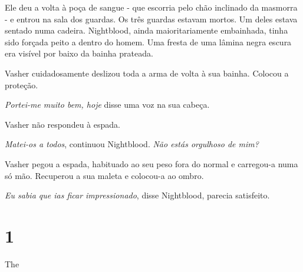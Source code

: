 \documentclass[11pt,a4paper]{book}
\begin{document}
 Ele deu a volta à poça de sangue - que escorria pelo chão inclinado da masmorra -  e entrou na sala dos guardas. Os três guardas estavam mortos. Um deles estava sentado numa cadeira. Nightblood, ainda maioritariamente embainhada, tinha sido forçada peito a dentro do homem. Uma fresta de uma lâmina negra escura era visível por baixo da bainha prateada.
 
 Vasher cuidadosamente deslizou toda a arma de volta à sua bainha. Colocou a proteção.
 
\textit{Portei-me muito bem, hoje} disse uma voz na sua cabeça.

Vasher não respondeu à espada.

\textit{Matei-os a todos}, continuou Nightblood. \textit{Não estás orgulhoso de mim?}

Vasher pegou a espada, habituado ao seu peso fora do normal e carregou-a numa só mão. Recuperou a sua maleta e colocou-a ao ombro. 

\textit{Eu sabia que ias ficar impressionado}, disse Nightblood, parecia satisfeito.
 
\chapter*{1}

The
\end{document}
